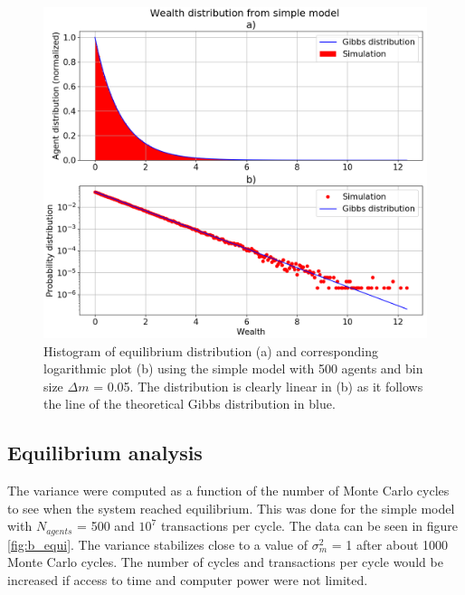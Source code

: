 \documentclass[11pt,a4paper,titlepage]{article}
\begin{document}
\begin{figure}[h!]
\centering
\includegraphics[scale=0.35]{task_b_histogram_agents_500_MCC_1000_N_trans_10000000.png}
\caption{Histogram of equilibrium distribution (a) and corresponding logarithmic plot (b) using the simple model with 500 agents and bin size $\Delta m$ = 0.05. The distribution is clearly linear in (b) as it follows the line of the theoretical Gibbs distribution in blue.   \label{fig:b_hist}}
\end{figure}

\subsection{Equilibrium analysis}
The variance were computed as a function of the number of Monte Carlo cycles to see when the system reached equilibrium. This was done for the simple model with $N_{agents}$ = 500 and $\textrm{$10^7$}$ transactions per cycle. The data can be seen in figure \ref{fig:b_equi}. The variance stabilizes close to a value of $\sigma^2_m$ = 1 after about 1000 Monte Carlo cycles. The number of cycles and transactions per cycle would be increased if access to time and computer power were not limited. 
\end{document}
